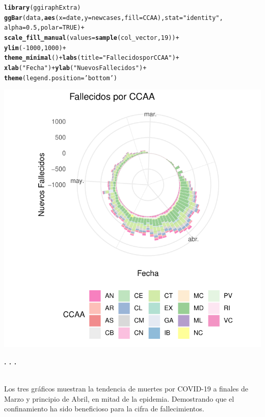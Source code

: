 \documentclass{article}\usepackage[]{graphicx}\usepackage[]{color}
\makeatletter
\def\maxwidth{ %
  \ifdim\Gin@nat@width>\linewidth
    \linewidth
  \else
    \Gin@nat@width
  \fi
}
\newcommand{\hlnum}[1]{\textcolor[rgb]{0.686,0.059,0.569}{#1}}%
\newcommand{\hlstr}[1]{\textcolor[rgb]{0.192,0.494,0.8}{#1}}%
\newcommand{\hlopt}[1]{\textcolor[rgb]{0,0,0}{#1}}%
\newcommand{\hlstd}[1]{\textcolor[rgb]{0.345,0.345,0.345}{#1}}%
\newcommand{\hlkwc}[1]{\textcolor[rgb]{0.333,0.667,0.333}{#1}}%
\newcommand{\hlkwd}[1]{\textcolor[rgb]{0.737,0.353,0.396}{\textbf{#1}}}%
\newenvironment{kframe}{%
 \def\at@end@of@kframe{}%
 \ifinner\ifhmode%
  \def\at@end@of@kframe{\end{minipage}}%
  \begin{minipage}{\columnwidth}%
 \fi\fi%
 \def\FrameCommand##1{\hskip\@totalleftmargin \hskip-\fboxsep
 \colorbox{shadecolor}{##1}\hskip-\fboxsep
     \hskip-\linewidth \hskip-\@totalleftmargin \hskip\columnwidth}%
 \MakeFramed {\advance\hsize-\width
   \@totalleftmargin\z@ \linewidth\hsize
   \@setminipage}}%
 {\par\unskip\endMakeFramed%
 \at@end@of@kframe}
\newenvironment{knitrout}{}{} %
\makeatother
\begin{document}
\begin{knitrout}
\color{fgcolor}\begin{kframe}
\begin{alltt}
\hlkwd{library}\hlstd{(ggiraphExtra)}
\hlkwd{ggBar}\hlstd{(data,} \hlkwd{aes}\hlstd{(}\hlkwc{x}\hlstd{=date,} \hlkwc{y}\hlstd{= newcases,} \hlkwc{fill} \hlstd{= CCAA),} \hlkwc{stat}\hlstd{=}\hlstr{"identity"}\hlstd{,}
      \hlkwc{alpha}\hlstd{=}\hlnum{0.5}\hlstd{,} \hlkwc{polar}\hlstd{=}\hlnum{TRUE}\hlstd{)} \hlopt{+}
  \hlkwd{scale_fill_manual}\hlstd{(}\hlkwc{values} \hlstd{=} \hlkwd{sample}\hlstd{(col_vector,} \hlnum{19}\hlstd{))} \hlopt{+}
  \hlkwd{ylim}\hlstd{(}\hlopt{-}\hlnum{1000}\hlstd{,}\hlnum{1000}\hlstd{)} \hlopt{+}
  \hlkwd{theme_minimal}\hlstd{()}\hlopt{+}\hlkwd{labs}\hlstd{(}\hlkwc{title} \hlstd{=} \hlstr{"Fallecidos por CCAA"}\hlstd{)} \hlopt{+}
        \hlkwd{xlab}\hlstd{(}\hlstr{"Fecha"}\hlstd{)}\hlopt{+}\hlkwd{ylab}\hlstd{(}\hlstr{"Nuevos Fallecidos"}\hlstd{)}\hlopt{+}
        \hlkwd{theme}\hlstd{(}\hlkwc{legend.position} \hlstd{=} \hlstr{'bottom'}\hlstd{)}
\end{alltt}
\end{kframe}

{\centering \includegraphics[width=\maxwidth]{figure/ggiraphExtra-1} 

}



\end{knitrout}
\begin{center}
\textbf{. . .}
\end{center}~\\
Los tres gr\'aficos muestran la tendencia de muertes por COVID-19 a finales de Marzo y principio de Abril, en mitad de la epidemia. Demostrando que el confinamiento ha sido beneficioso para la cifra de fallecimientos. 
\end{document}
